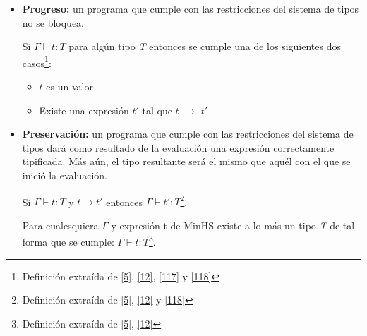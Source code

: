         \begin{itemize}
            \item \textbf{Progreso:} un programa que cumple con las restricciones del sistema de tipos no se bloquea. %
             
             \begin{definition}
                Si $\Gamma \vdash t : \textit{T}$ para algún tipo \textit{T} entonces se cumple una de los siguientes dos casos\footnote{Definición extraída de  \hyperlink{5}{[5]},  \hyperlink{12}{[12]}, \hyperlink{117}{[117]} y  \hyperlink{118}{[118]}}:
                \begin{itemize}
			\item $t$ es un valor 
                	\item Existe una expresión $t'$ tal que $t$ $\to$ $t'$
		   \end{itemize}
             \end{definition}

            \item \textbf{Preservación:} un programa que cumple con las restricciones del sistema de tipos dará como resultado de la evaluación una expresión correctamente tipificada. Más aún, el tipo resultante será el mismo que aquél con el que se inició la evaluación. %
                                    
                     \begin{definition}
                        Sí $\Gamma \vdash t : \textit{T}$ y $t \to t'$ entonces $\Gamma \vdash t' : \textit{T}$\footnote{Definición extraída de  \hyperlink{5}{[5]},  \hyperlink{12}{[12]}  y \hyperlink{118}{[118]}}.
                    \end{definition}

                    \begin{definition}
                        Para cualesquiera $\Gamma$ y expresión t de \textsf{MinHS} existe a lo más un tipo \textit{T} de tal forma que se cumple: $\Gamma \vdash t : \textit{T}$\footnote{Definición extraída de \hyperlink{5}{[5]},  \hyperlink{12}{[12]}}.
                    \end{definition}

        \end{itemize}

